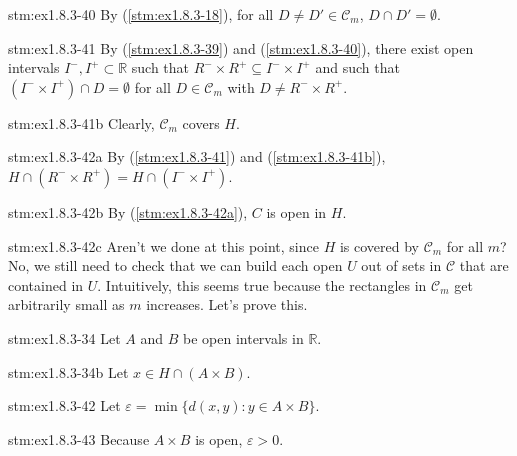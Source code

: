 \begin{statement}{stm:ex1.8.3-40}
By (\ref{stm:ex1.8.3-18}), for all $D \ne D' \in \mathcal{C}_m$, $D \cap D' = \emptyset$.
\end{statement}

\begin{statement}{stm:ex1.8.3-41}
By (\ref{stm:ex1.8.3-39}) and (\ref{stm:ex1.8.3-40}), there exist open intervals $I^-, I^+ \subset \mathbb{R}$ such that $R^- \times R^+ \subseteq I^- \times I^+$ and such that $(I^- \times I^+) \cap D = \emptyset$ for all $D \in \mathcal{C}_m$ with $D \ne R^- \times R^+$. 
\end{statement}

\begin{statement}{stm:ex1.8.3-41b}
Clearly, $\mathcal{C}_m$ covers $H$.
\end{statement}

\begin{statement}{stm:ex1.8.3-42a}
By (\ref{stm:ex1.8.3-41}) and (\ref{stm:ex1.8.3-41b}), $H \cap (R^- \times R^+) = H \cap (I^- \times I^+)$.
\end{statement}

\begin{statement}{stm:ex1.8.3-42b}
By (\ref{stm:ex1.8.3-42a}), $C$ is open in $H$.
\end{statement}

\begin{explanation}{stm:ex1.8.3-42c}
Aren’t we done at this point, since $H$ is covered by $\mathcal{C}_m$ for all $m$? No, we still need to check that we can build each open $U$ out of sets in $\mathcal{C}$ that are contained in $U$. Intuitively, this seems true because the rectangles in $\mathcal{C}_m$ get arbitrarily small as $m$ increases. Let's prove this.
\end{explanation}

\begin{statement}{stm:ex1.8.3-34}
Let $A$ and $B$ be open intervals in $\mathbb{R}$.
\end{statement}

\begin{statement}{stm:ex1.8.3-34b}
Let $x \in H \cap (A \times B)$.
\end{statement}

\begin{statement}{stm:ex1.8.3-42}
Let $\varepsilon = \min\{ d(x, y) : y \in A \times B \}$. 
\end{statement}

\begin{statement}{stm:ex1.8.3-43}
Because $A \times B$ is open, $\varepsilon > 0$.
\end{statement}

